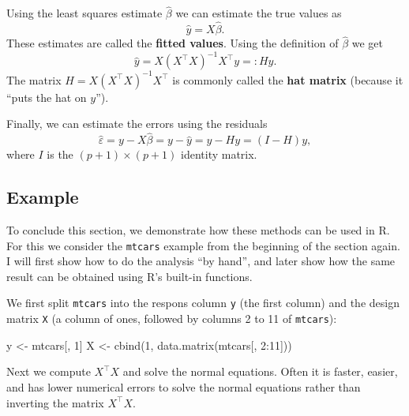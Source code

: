 \documentclass[
  a4paper,
]{article}
\newenvironment{Shaded}{\begin{snugshade}}{\end{snugshade}}
\newcommand{\DecValTok}[1]{\textcolor[rgb]{0.00,0.00,0.81}{#1}}
\newcommand{\FunctionTok}[1]{\textcolor[rgb]{0.00,0.00,0.00}{#1}}
\newcommand{\NormalTok}[1]{#1}
\newcommand{\OtherTok}[1]{\textcolor[rgb]{0.56,0.35,0.01}{#1}}
\newcommand{\SpecialCharTok}[1]{\textcolor[rgb]{0.00,0.00,0.00}{#1}}
\theoremstyle{definition}
\theoremstyle{definition}
\theoremstyle{definition}
\theoremstyle{definition}
\theoremstyle{remark}
\begin{document}
Using the least squares estimate \(\hat\beta\) we can estimate the true
values as
\begin{equation}
  \hat y = X \hat\beta.  \label{eq:fitted-values}
\end{equation}
These estimates are called the \textbf{fitted values}. Using the
definition of \(\hat\beta\) we get
\begin{equation*}
  \hat y
  = X (X^\top X)^{-1} X^\top y
  =: Hy.
\end{equation*}
The matrix \(H = X (X^\top X)^{-1} X^\top\) is commonly called the \textbf{hat
matrix} (because it ``puts the hat on \(y\)'').

Finally, we can estimate the errors using the residuals
\begin{equation}
  \hat\varepsilon
  = y - X \hat\beta
  = y - \hat y
  = y - H y
  = (I - H) y,  \label{eq:fitted-errors}
\end{equation}
where \(I\) is the \((p+1)\times (p+1)\) identity matrix.

\hypertarget{example}{%
\subsection{Example}\label{example}}

To conclude this section, we demonstrate how these methods can be used
in R. For this we consider the \texttt{mtcars} example from the beginning of
the section again. I will first show how to do the analysis ``by hand'',
and later show how the same result can be obtained using R's built-in functions.

We first split \texttt{mtcars} into the respons column \texttt{y} (the first column)
and the design matrix \texttt{X} (a column of ones, followed by columns 2 to 11
of \texttt{mtcars}):

\begin{Shaded}
\begin{Highlighting}[]
\NormalTok{y }\OtherTok{\textless{}{-}}\NormalTok{ mtcars[, }\DecValTok{1}\NormalTok{]}
\NormalTok{X }\OtherTok{\textless{}{-}} \FunctionTok{cbind}\NormalTok{(}\DecValTok{1}\NormalTok{, }\FunctionTok{data.matrix}\NormalTok{(mtcars[, }\DecValTok{2}\SpecialCharTok{:}\DecValTok{11}\NormalTok{]))}
\end{Highlighting}
\end{Shaded}

Next we compute \(X^\top X\) and solve the normal equations. Often it is
faster, easier, and has lower numerical errors to solve the normal equations
rather than inverting the matrix \(X^\top X\).
\end{document}

